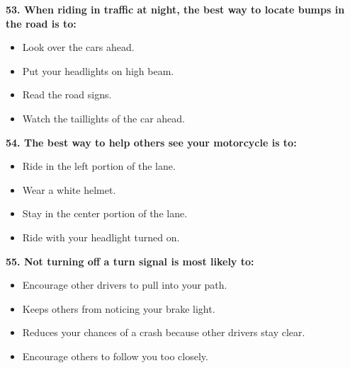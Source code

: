 \begin{minipage}{\linewidth}
\vspace{1em}\noindent\textbf{53. When riding in traffic at night, the best way to locate bumps in the road is to:}

\begin{itemize}[nosep,leftmargin=2em]
\item [A.] Look over the cars ahead.
\item [B.] Put your headlights on high beam.
\item [C.] Read the road signs.
\item [D.] Watch the taillights of the car ahead.

\end{itemize}
\end{minipage}


\begin{minipage}{\linewidth}
\vspace{1em}\noindent\textbf{54. The best way to help others see your motorcycle is to:}

\begin{itemize}[nosep,leftmargin=2em]
\item [A.] Ride in the left portion of the lane.
\item [B.] Wear a white helmet.
\item [C.] Stay in the center portion of the lane.
\item [D.] Ride with your headlight turned on.

\end{itemize}
\end{minipage}


\begin{minipage}{\linewidth}
\vspace{1em}\noindent\textbf{55. Not turning off a turn signal is most likely to:}

\begin{itemize}[nosep,leftmargin=2em]
\item [A.] Encourage other drivers to pull into your path.
\item [B.] Keeps others from noticing your brake light.
\item [C.] Reduces your chances of a crash because other drivers stay clear.
\item [D.] Encourage others to follow you too closely.

\end{itemize}
\end{minipage}


